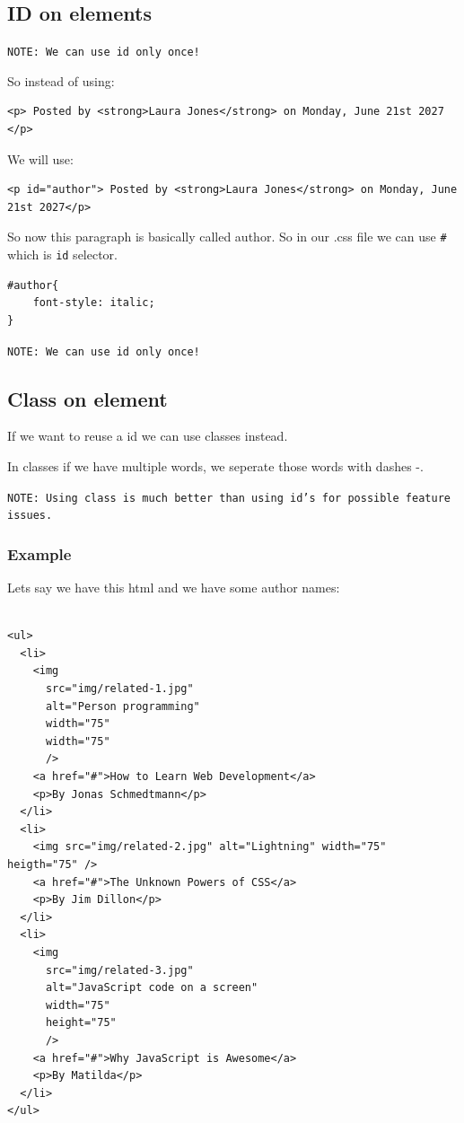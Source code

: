 \documentclass[11pt]{article}
\begin{document}
\subsection{ID on elements}
\label{sec:org5b8a851}

\texttt{NOTE: We can use id only once!}

So instead of using:

\begin{verbatim}
<p> Posted by <strong>Laura Jones</strong> on Monday, June 21st 2027 </p>
\end{verbatim}

We will use:

\begin{verbatim}
<p id="author"> Posted by <strong>Laura Jones</strong> on Monday, June 21st 2027</p>
\end{verbatim}

So now this paragraph is basically called author. So in our .css file we can use \texttt{\#} which is \texttt{id} selector.

\begin{verbatim}
#author{
    font-style: italic;
}
\end{verbatim}

\texttt{NOTE: We can use id only once!}
\subsection{Class on element}
\label{sec:org9ffe1b0}

If we want to reuse a id we can use classes instead.

In classes if we have multiple words, we seperate those words with dashes -.

\texttt{NOTE: Using class is much better than using id's for possible feature issues.}
\subsubsection{Example}
\label{sec:org10983d7}
Lets say we have this html and we have some author names:
\begin{verbatim}

<ul>
  <li>
    <img
      src="img/related-1.jpg"
      alt="Person programming"
      width="75"
      width="75"
      />
    <a href="#">How to Learn Web Development</a>
    <p>By Jonas Schmedtmann</p>
  </li>
  <li>
    <img src="img/related-2.jpg" alt="Lightning" width="75" heigth="75" />
    <a href="#">The Unknown Powers of CSS</a>
    <p>By Jim Dillon</p>
  </li>
  <li>
    <img
      src="img/related-3.jpg"
      alt="JavaScript code on a screen"
      width="75"
      height="75"
      />
    <a href="#">Why JavaScript is Awesome</a>
    <p>By Matilda</p>
  </li>
</ul>
\end{verbatim}
\end{document}
